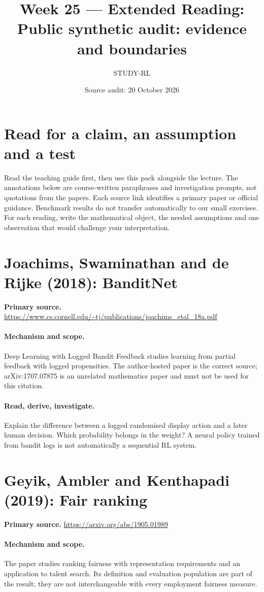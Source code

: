\documentclass[11pt]{scrartcl}
\title{Week 25 --- Extended Reading: Public synthetic audit: evidence and boundaries}
\author{STUDY-RL}
\date{Source audit: 20 October 2026}
\begin{document}
\maketitle
\section*{Read for a claim, an assumption and a test}
Read the teaching guide first, then use this pack alongside the lecture.
The annotations below are course-written paraphrases and investigation prompts,
not quotations from the papers. Each source link identifies a primary paper
or official guidance. Benchmark results do not transfer automatically to our
small exercises. For each reading, write the mathematical object, the needed
assumptions and one observation that would challenge your interpretation.

\section{Joachims, Swaminathan and de Rijke (2018): BanditNet}
\noindent\textbf{Primary source.} \url{https://www.cs.cornell.edu/~tj/publications/joachims_etal_18a.pdf}

\paragraph{Mechanism and scope.} Deep Learning with Logged Bandit Feedback studies learning from partial feedback with logged propensities. The author-hosted paper is the correct source; arXiv:1707.07875 is an unrelated mathematics paper and must not be used for this citation.

\paragraph{Read, derive, investigate.} Explain the difference between a logged randomised display action and a later human decision. Which probability belongs in the weight? A neural policy trained from bandit logs is not automatically a sequential RL system.

\section{Geyik, Ambler and Kenthapadi (2019): Fair ranking}
\noindent\textbf{Primary source.} \url{https://arxiv.org/abs/1905.01989}

\paragraph{Mechanism and scope.} The paper studies ranking fairness with representation requirements and an application to talent search. Its definition and evaluation population are part of the result; they are not interchangeable with every employment fairness measure.
\end{document}
